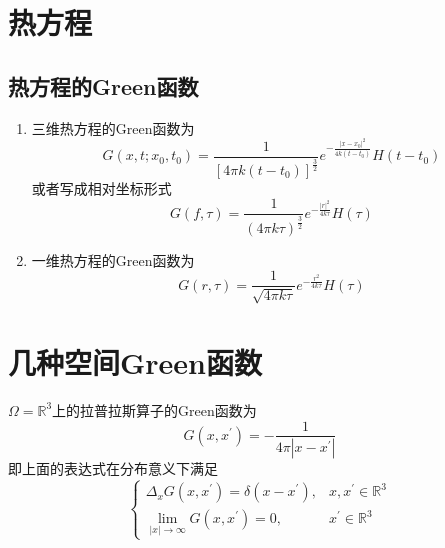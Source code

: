 \documentclass[../../main.tex]{subfiles}
\begin{document}
\section{热方程}

\subsection{热方程的Green函数}
\begin{theorem}
    \begin{enumerate}
        \item 三维热方程的Green函数为 \[
        G\left( x,t;x_0,t_0 \right)= \frac{1 }{\left[ 4\pi k\left( t-t_0 \right) \right] ^{\frac{3}{2}}  }e^{-\frac{\left| x-x_0 \right|^{2}  }{4k\left( t-t_0 \right)  } }H\left( t-t_0 \right)   
        \]或者写成相对坐标形式 \[
        G\left( f,\tau  \right)= \frac{1 }{\left( 4\pi k\tau  \right)^{\frac{3}{2}}  }e^{-\frac{\left| r \right|^{2}  }{4 k\tau  } }H\left( \tau  \right)   
        \]
        \item 一维热方程的Green函数为 \[
        G\left( r,\tau  \right)= \frac{1 }{\sqrt{4\pi k\tau } }e^{-\frac{r^{2} }{4k \tau  } }H\left( \tau  \right)   
        \]
    \end{enumerate}
    
\end{theorem}

 \section{几种空间Green函数}

 \begin{theorem}
    \(   \Omega = \mathbb{R} ^{3}  \)上的拉普拉斯算子的Green函数为 \[
    G\left( x,x^{\prime}  \right)= -\frac{1 }{4\pi \left| x-x^{\prime}  \right|  }  
    \] 即上面的表达式在分布意义下满足 \[
    \begin{cases}  \Delta_{x}G\left( x,x^{\prime}  \right)=  \delta \left( x-x^{\prime}  \right) ,&x,x^{\prime} \in \mathbb{R} ^{3}\\ 
     \lim_{\left| x  \right|\to \infty }G\left( x,x^{\prime}  \right)= 0,&x^{\prime} \in \mathbb{R} ^{3}    \end{cases} 
    \]
 \end{theorem}
\end{document}
